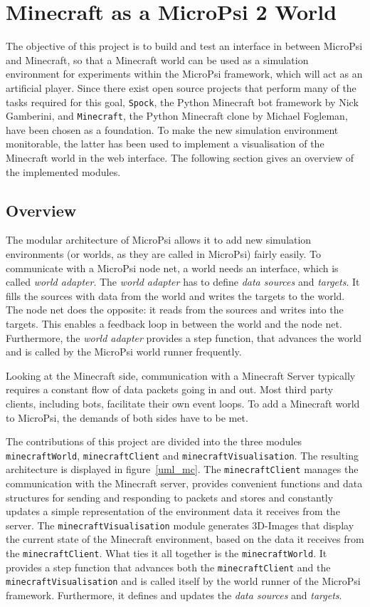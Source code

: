 \chapter{Minecraft as a MicroPsi 2 World}
The objective of this project is to build and test an interface in between MicroPsi and Minecraft, so that a Minecraft world can be used as a simulation environment for experiments within the MicroPsi framework, which will act as an artificial player. Since there exist open source projects that perform many of the tasks required for this goal, \texttt{Spock}, the Python Minecraft bot framework by Nick Gamberini, and \texttt{Minecraft}, the Python Minecraft clone by Michael Fogleman, have been chosen as a foundation. To make the new simulation environment monitorable, the latter has been used to implement a visualisation of the Minecraft world in the web interface. The following section gives an overview of the implemented modules.

\section{Overview}
The modular architecture of MicroPsi allows it to add new simulation environments (or worlds, as they are called in MicroPsi) fairly easily. To communicate with a MicroPsi node net, a world needs an interface, which is called \emph{world adapter}. The \emph{world adapter} has to define \emph{data sources} and \emph{targets}. It fills the sources with data from the world and writes the targets to the world. The node net does the opposite: it reads from the sources and writes into the targets. This enables a feedback loop in between the world and the node net. Furthermore, the \emph{world adapter} provides a step function, that advances the world and is called by the MicroPsi world runner frequently.

Looking at the Minecraft side, communication with a Minecraft Server typically requires a constant flow of data packets going in and out. Most third party clients, including bots, facilitate their own event loops. To add a Minecraft world to MicroPsi, the demands of both sides have to be met.

The contributions of this project are divided into the three modules \texttt{minecraftWorld}, \texttt{minecraftClient} and \texttt{minecraftVisualisation}. The resulting architecture is displayed in figure~\ref{uml_mc}. The \texttt{minecraftClient} manages the communication with the Minecraft server, provides convenient functions and data structures for sending and responding to packets and stores and constantly updates a simple representation of the environment data it receives from the server. The \texttt{minecraftVisualisation} module generates 3D-Images that display the current state of the Minecraft environment, based on the data it receives from the \texttt{minecraftClient}. What ties it all together is the \texttt{minecraftWorld}. It provides a step function that advances both the \texttt{minecraftClient} and the \texttt{minecraftVisualisation} and is called itself by the world runner of the MicroPsi framework. Furthermore, it defines and updates the \emph{data sources} and \emph{targets}.

